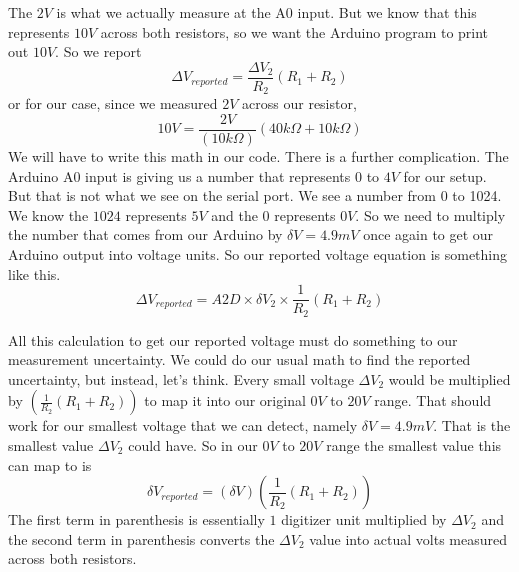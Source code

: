 The $2\unit{V}$ is what we actually measure at the A0 input. But we know
that this represents $10\unit{V}$ across both resistors, so we want the
Arduino program to print out $10\unit{V}.$ So we report%
\begin{equation*}
\Delta V_{reported}=\frac{\Delta V_{2}}{R_{2}}\left( R_{1}+R_{2}\right)
\end{equation*}%
or for our case, since we measured $2\unit{V}$ across our resistor,%
\begin{equation*}
10\unit{V}=\frac{2\unit{V}}{\left( 10\unit{k%
\Omega%
}\right) }\left( 40\unit{k%
\Omega%
}+10\unit{k%
\Omega%
}\right)
\end{equation*}%
We will have to write this math in our code. There is a further
complication. The Arduino A0 input is giving us a number that represents $0$
to $4\unit{V}$ for our setup. But that is not what we see on the serial
port. We see a number from 0 to 1024. We know the $1024$ represents $5\unit{V%
}$ and the $0$ represents $0\unit{V}.$ So we need to multiply the number
that comes from our Arduino by $\delta V=4.9\unit{mV}$ once again to get our
Arduino output into voltage units. So our reported voltage equation is
something like this. 
\begin{equation*}
\Delta V_{reported}=A2D\times \delta V_{2}\times \frac{1}{R_{2}}\left(
R_{1}+R_{2}\right)
\end{equation*}

All this calculation to get our reported voltage must do something to our
measurement uncertainty. We could do our usual math to find the reported
uncertainty, but instead, let's think. Every small voltage $\Delta V_{2}$
would be multiplied by $\left( \frac{1}{R_{2}}\left( R_{1}+R_{2}\right)
\right) $ to map it into our original $0\unit{V}$ to $20\unit{V}$ range.
That should work for our smallest voltage that we can detect, namely $\delta
V=4.9\unit{mV}.$ That is the smallest value $\Delta V_{2}$ could have. So in
our $0\unit{V}$ to $20\unit{V}$ range the smallest value this can map to is 
\begin{equation*}
\delta V_{reported}=\left( \delta V\right) \left( \frac{1}{R_{2}}\left(
R_{1}+R_{2}\right) \right)
\end{equation*}%
The first term in parenthesis is essentially $1$ digitizer unit multiplied
by $\Delta V_{2}$ and the second term in parenthesis converts the $\Delta
V_{2}$ value into actual volts measured across both resistors.

